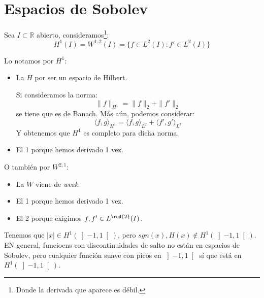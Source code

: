\section{Espacios de Sobolev}
\begin{definicion}
    Sea $I\subset \mathbb{R}$ abierto, consideramos\footnote{Donde la derivada que aparece es débil.}:
    \begin{equation*}
        H^1(I) = W^{1,2}(I) = \{f\in L^2(I):f'\in L^2(I)\}
    \end{equation*}
\end{definicion}

\begin{notacion}
    Lo notamos por $H^1$:
    \begin{itemize}
        \item La $H$ por ser un espacio de Hilbert.

            Si consideramos la norma:
            \begin{equation*}
                \|f\|_{H^1} = \|f\|_2 + \|f'\|_2
            \end{equation*}
            se tiene que es de Banach. Más aún, podemos considerar:
            \begin{equation*}
                \langle f,g \rangle_{H^1} = \langle f,g \rangle_{L^2} + \langle f',g' \rangle_{L^2}
            \end{equation*}
            Y obtenemos que $H^1$ es completo para dicha norma.
        \item El 1 porque hemos derivado 1 vez.
    \end{itemize}
    O también por $W^{2,1}$:
    \begin{itemize}
        \item La $W$ viene de \textit{weak}.
        \item El 1 porque hemos derivado 1 vez.
        \item El 2 porque exigimos $f,f'\in L^{\red{2}}(I)$.
    \end{itemize}
\end{notacion}

\begin{ejemplo}
    Tenemos que $|x|\in H^1(\left]-1,1\right[)$, pero $sgn(x),H(x)\notin H^1(\left]-1,1\right[)$. EN general, funcioens con discontinuidades de salto no están en espacios de Sobolev, pero cualquier función suave con picos en $\left]-1,1\right[$ sí que está en $H^1(\left]-1,1\right[)$.
\end{ejemplo}


